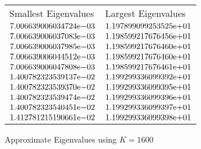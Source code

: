 \begin{enumerate}
\begin{figure}[tbh]
 \centering    
\begin{tabular}{ ||p{6cm}||p{6cm}|}
\hline
 Smallest Eigenvalues & Largest Eigenvalues \\ \hhline{|=|=|}     
\hline
${7.006639006034724}\mathrm{e}{-03}$ & ${1.197899099253525}\mathrm{e}{+01}$ \\  
${7.006639006037083}\mathrm{e}{-03}$ & ${1.198599217676456}\mathrm{e}{+01}$ \\  
${7.006639006037985}\mathrm{e}{-03}$ & ${1.198599217676460}\mathrm{e}{+01}$ \\  
${7.006639006044512}\mathrm{e}{-03}$ & ${1.198599217676460}\mathrm{e}{+01}$ \\  
${7.006639006047808}\mathrm{e}{-03}$ & ${1.198599217676461}\mathrm{e}{+01}$ \\  
${1.400782323539137}\mathrm{e}{-02}$ & ${1.199299336099392}\mathrm{e}{+01}$ \\  
${1.400782323539370}\mathrm{e}{-02}$ & ${1.199299336099395}\mathrm{e}{+01}$ \\  
${1.400782323539474}\mathrm{e}{-02}$ & ${1.199299336099396}\mathrm{e}{+01}$ \\  
${1.400782323540451}\mathrm{e}{-02}$ & ${1.199299336099397}\mathrm{e}{+01}$ \\  
${1.412781215190661}\mathrm{e}{-02}$ & ${1.199299336099398}\mathrm{e}{+01}$ \\  
\hline  
\end{tabular} 
\caption{Approximate Eigenvalues using $K = 1600$}
   \label{tab:app_eig_1600}
\end{figure} 


\end{enumerate}
